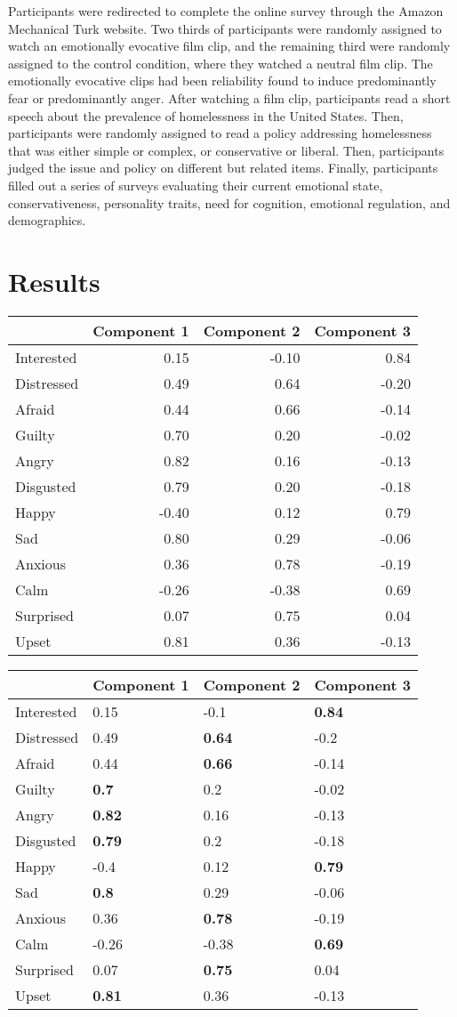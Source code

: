 \documentclass[man,draftall]{apa6}
\begin{document}
Participants were redirected to complete the online survey through the
Amazon Mechanical Turk website. Two thirds of participants were randomly
assigned to watch an emotionally evocative film clip, and the remaining
third were randomly assigned to the control condition, where they
watched a neutral film clip. The emotionally evocative clips had been
reliability found to induce predominantly fear or predominantly anger.
After watching a film clip, participants read a short speech about the
prevalence of homelessness in the United States. Then, participants were
randomly assigned to read a policy addressing homelessness that was
either simple or complex, or conservative or liberal. Then, participants
judged the issue and policy on different but related items. Finally,
participants filled out a series of surveys evaluating their current
emotional state, conservativeness, personality traits, need for
cognition, emotional regulation, and demographics.

\section{Results}\label{results}

\begin{longtable}[]{@{}lrrr@{}}
\toprule
& Component 1 & Component 2 & Component 3\tabularnewline
\midrule
\endhead
Interested & 0.15 & -0.10 & 0.84\tabularnewline
Distressed & 0.49 & 0.64 & -0.20\tabularnewline
Afraid & 0.44 & 0.66 & -0.14\tabularnewline
Guilty & 0.70 & 0.20 & -0.02\tabularnewline
Angry & 0.82 & 0.16 & -0.13\tabularnewline
Disgusted & 0.79 & 0.20 & -0.18\tabularnewline
Happy & -0.40 & 0.12 & 0.79\tabularnewline
Sad & 0.80 & 0.29 & -0.06\tabularnewline
Anxious & 0.36 & 0.78 & -0.19\tabularnewline
Calm & -0.26 & -0.38 & 0.69\tabularnewline
Surprised & 0.07 & 0.75 & 0.04\tabularnewline
Upset & 0.81 & 0.36 & -0.13\tabularnewline
\bottomrule
\end{longtable}

\begin{longtable}[]{@{}llll@{}}
\toprule
& Component 1 & Component 2 & Component 3\tabularnewline
\midrule
\endhead
Interested & 0.15 & -0.1 & \textbf{0.84}\tabularnewline
Distressed & 0.49 & \textbf{0.64} & -0.2\tabularnewline
Afraid & 0.44 & \textbf{0.66} & -0.14\tabularnewline
Guilty & \textbf{0.7} & 0.2 & -0.02\tabularnewline
Angry & \textbf{0.82} & 0.16 & -0.13\tabularnewline
Disgusted & \textbf{0.79} & 0.2 & -0.18\tabularnewline
Happy & -0.4 & 0.12 & \textbf{0.79}\tabularnewline
Sad & \textbf{0.8} & 0.29 & -0.06\tabularnewline
Anxious & 0.36 & \textbf{0.78} & -0.19\tabularnewline
Calm & -0.26 & -0.38 & \textbf{0.69}\tabularnewline
Surprised & 0.07 & \textbf{0.75} & 0.04\tabularnewline
Upset & \textbf{0.81} & 0.36 & -0.13\tabularnewline
\bottomrule
\end{longtable}
\end{document}
